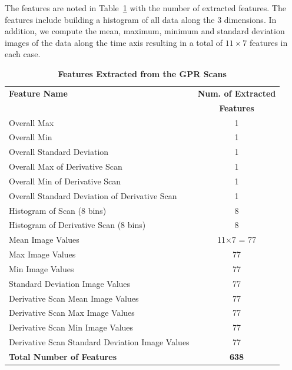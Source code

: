 \documentclass{ieeeaccess}
\begin{document}
The features are noted in Table~\ref{Table03} with the number of extracted features. The features include building a histogram of all data along the $3$ dimensions. In addition, we compute the mean, maximum, minimum and standard deviation images of the data along the time axis resulting in a total of $11\times7$ features in each case.


\begin{table}
\caption{\textbf{Features Extracted from the GPR Scans}}
\label{Table03}
\setlength{\tabcolsep}{3pt}
\begin{center}
\begin{tabular}{|l|c|}
\hline
\textbf{Feature Name}	& \textbf{Num. of Extracted} \\
 & \textbf{Features} \\
\hline \hline
Overall Max	& 1 \\ \hline
Overall Min	& 1 \\ \hline
Overall Standard Deviation	& 1 \\ \hline
Overall Max of Derivative Scan	& 1 \\ \hline
Overall Min of Derivative Scan	& 1 \\ \hline
Overall Standard Deviation of Derivative Scan &1 \\ \hline
Histogram of Scan (8 bins)	& 8 \\ \hline
Histogram of Derivative Scan (8 bins)	& 8 \\ \hline
Mean Image Values	& 11$\times$7 = 77 \\ \hline
Max Image Values	& 77 \\ \hline
Min Image Values	& 77 \\ \hline
Standard Deviation Image Values	& 77 \\ \hline
Derivative Scan Mean Image Values	& 77 \\ \hline
Derivative Scan Max Image Values	& 77 \\ \hline
Derivative Scan Min Image Values	& 77 \\ \hline
Derivative Scan Standard Deviation Image Values	& 77 \\ \hline \hline
\textbf{Total Number of Features}	& \textbf{638} \\
\hline
\end{tabular}
\end{center}
\end{table}
\end{document}
